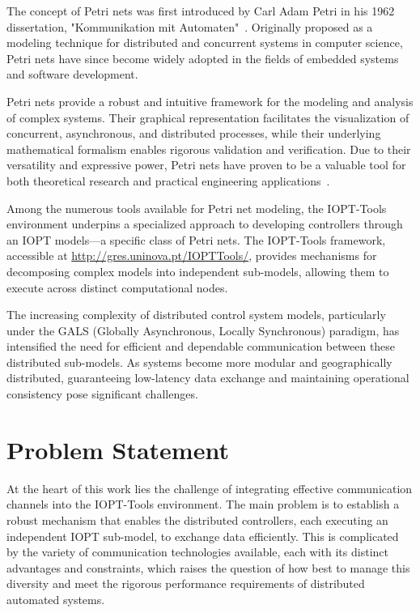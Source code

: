 The concept of Petri nets was first introduced by Carl Adam Petri in his 1962 dissertation, "Kommunikation mit Automaten"~\cite{petri1962}. Originally proposed as a modeling technique for distributed and concurrent systems in computer science, Petri nets have since become widely adopted in the fields of embedded systems and software development.

Petri nets provide a robust and intuitive framework for the modeling and analysis of complex systems. Their graphical representation facilitates the visualization of concurrent, asynchronous, and distributed processes, while their underlying mathematical formalism enables rigorous validation and verification. Due to their versatility and expressive power, Petri nets have proven to be a valuable tool for both theoretical research and practical engineering applications~\cite{murata}.

Among the numerous tools available for Petri net modeling, the IOPT-Tools environment underpins a specialized approach to developing controllers through an IOPT models—a specific class of Petri nets. The IOPT-Tools framework, accessible at \url{http://gres.uninova.pt/IOPTTools/}, provides mechanisms for decomposing complex models into independent sub-models, allowing them to execute across distinct computational nodes.

The increasing complexity of distributed control system models, particularly under the GALS (Globally Asynchronous, Locally Synchronous) paradigm, has intensified the need for efficient and dependable communication between these distributed sub-models. As systems become more modular and geographically distributed, guaranteeing low-latency data exchange and maintaining operational consistency pose significant challenges. 

\section{Problem Statement}
\label{sec:problem_statement}


At the heart of this work lies the challenge of integrating effective communication channels into the IOPT-Tools environment. The main problem is to establish a robust mechanism that enables the distributed controllers, each executing an independent IOPT sub-model, to exchange data efficiently. This is complicated by the variety of communication technologies available, each with its distinct advantages and constraints, which raises the question of how best to manage this diversity and meet the rigorous performance requirements of distributed automated systems.

